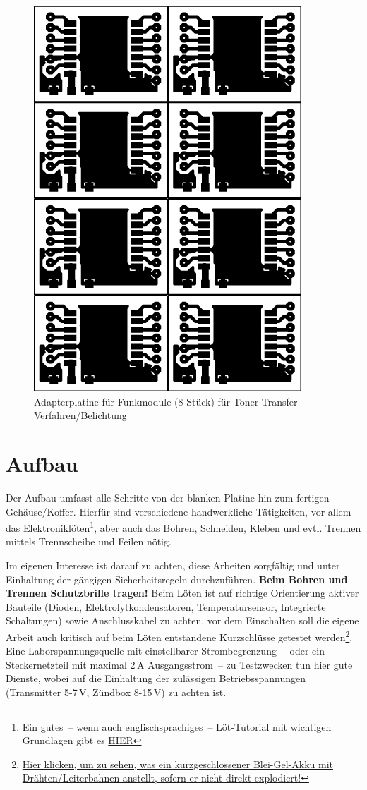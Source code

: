 \documentclass[paper=a4, parskip, numbers=noenddot, toc=listof, headsepline]{scrbook}
\begin{document}
		\begin{figure}
			\centering
			\includegraphics[scale=1]{Bilder/rfm-dil-70x100}
			\caption{Adapterplatine für Funkmodule (8 Stück) für Toner-Transfer-Verfahren/Belichtung}
			\label{fig:rfmprint}
		\end{figure}



	\chapter{Aufbau}

		Der Aufbau umfasst alle Schritte von der blanken Platine hin zum fertigen Gehäuse/Koffer. Hierfür sind verschiedene handwerkliche Tätigkeiten, vor allem das Elektroniklöten\footnote{Ein gutes~-- wenn auch englischsprachiges~-- Löt-Tutorial mit wichtigen Grundlagen gibt es \href{https://www.youtube.com/watch?v=I_NU2ruzyc4}{HIER}}, aber auch das Bohren, Schneiden, Kleben und evtl. Trennen mittels Trennscheibe und Feilen nötig.

		Im eigenen Interesse ist darauf zu achten, diese Arbeiten sorgfältig und unter Einhaltung der gängigen Sicherheitsregeln durchzuführen. \textbf{Beim Bohren und Trennen Schutzbrille tragen!} Beim Löten ist auf richtige Orientierung aktiver Bauteile (Dioden, Elektrolytkondensatoren, Temperatursensor, Integrierte Schaltungen) sowie Anschlusskabel zu achten, vor dem Einschalten soll die eigene Arbeit auch kritisch auf beim Löten entstandene Kurzschlüsse getestet werden\footnote{\href{http://www.youtube.com/watch?v=79dauuviLe4}{Hier klicken, um zu sehen, was ein kurzgeschlossener Blei-Gel-Akku mit Drähten/Leiterbahnen anstellt, sofern er nicht direkt explodiert!}}. Eine Laborspannungsquelle mit einstellbarer Strombegrenzung~-- oder ein Steckernetzteil mit maximal 2\,A Ausgangsstrom~-- zu Testzwecken tun hier gute Dienste, wobei auf die Einhaltung der zulässigen Betriebsspannungen (Transmitter 5-7\,V, Zündbox 8-15\,V) zu achten ist.
\end{document}
